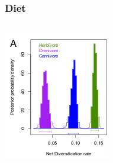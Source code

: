 \documentclass{beamer}
\begin{document}
\begin{frame}
  \frametitle{Diet}

  \begin{columns}
    \begin{column}{0.5\textwidth}
      \includegraphics[height=0.5\textheight,width=\textwidth,keepaspectratio=true]{figure/dietdiv}


\end{column}
\end{columns}
\end{frame}
\end{document}
